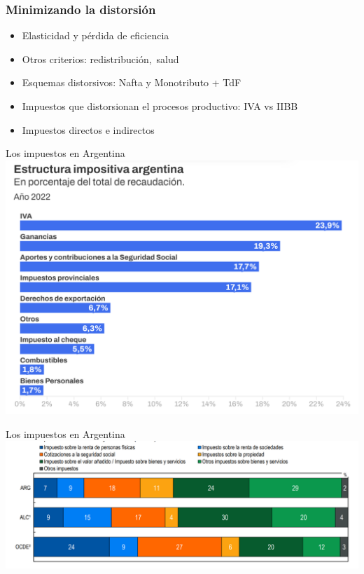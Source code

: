 \documentclass{beamer}
\begin{document}
\begin{frame}
\frametitle{Minimizando la distorsión}
\begin{itemize}
    \item Elasticidad y pérdida de eficiencia 
    \item Otros criterios: redistribución, salud
    \item Esquemas distorsivos: Nafta y Monotributo + TdF
    \item Impuestos que distorsionan el procesos productivo: IVA vs IIBB
    \item Impuestos directos e indirectos
\end{itemize}
\end{frame}

\begin{frame}{Los impuestos en Argentina}
\centering
 \includegraphics[scale=0.6]{Slides Principios de Economia/Figures/Impositiva.png}   
\end{frame}

\begin{frame}{Los impuestos en Argentina}
\centering
 \includegraphics[scale=0.6]{Slides Principios de Economia/Figures/Impositiva II.png}   
\end{frame}
\end{document}
